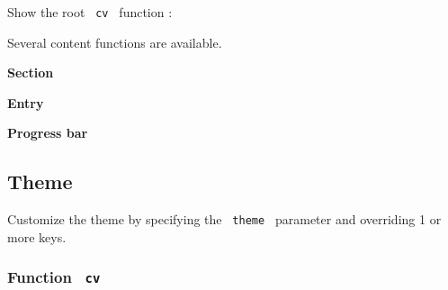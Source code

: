 Show the root \texttt{\ cv\ } function :

\begin{Shaded}
\begin{Highlighting}[]
\NormalTok{  aside: [}
\NormalTok{  ]}

\end{Highlighting}
\end{Shaded}

Several content functions are available.

\textbf{Section}

\begin{Shaded}
\begin{Highlighting}[]
\NormalTok{)}
\end{Highlighting}
\end{Shaded}

\textbf{Entry}

\begin{Shaded}
\begin{Highlighting}[]

\NormalTok{)}
\end{Highlighting}
\end{Shaded}

\textbf{Progress bar}

\begin{Shaded}
\begin{Highlighting}[]
\end{Highlighting}
\end{Shaded}

\subsection{Theme}\label{theme}

Customize the theme by specifying the \texttt{\ theme\ } parameter and
overriding 1 or more keys.

\subsubsection{\texorpdfstring{Function
\texttt{\ cv\ }}{Function  cv }}\label{function-cv}

